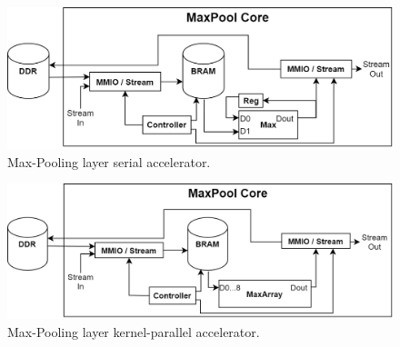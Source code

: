 \begin{figure} [H]
	\centering
	\includegraphics[width=\textwidth]{Images/Platform/MaxPool_core_serial.png}
	\decoRule
	\caption[Max-Pooling layer serial accelerator]{Max-Pooling layer serial accelerator.}
	\label{fig:max-pool-core-serial}
\end{figure}

\begin{figure} [H]
	\centering
	\includegraphics[width=\textwidth]{Images/Platform/MaxPool_core_kernel_parallel.png}
	\decoRule
	\caption[Max-Pooling layer kernel-parallel accelerator]{Max-Pooling layer kernel-parallel accelerator.}
	\label{fig:max-pool-core-kernel-parallel}
\end{figure}

